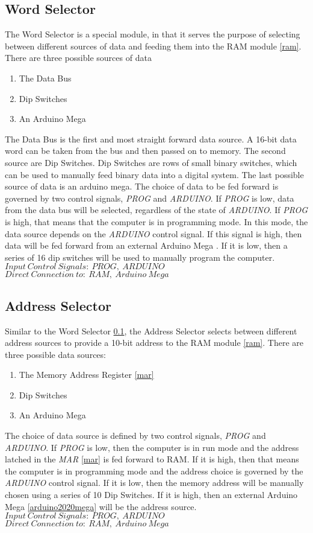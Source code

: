 \subsection{Word Selector} \label{word-select}
The Word Selector is a special module, in that it serves the purpose of selecting between different sources of data and feeding
them into the RAM module \ref{ram}. There are three possible sources of data
\begin{enumerate}
  \item The Data Bus
  \item Dip Switches
  \item An Arduino Mega
\end{enumerate}
The Data Bus is the first and most straight forward data source. A 16-bit data word can be taken from the bus and then passed on
to memory. The second source are Dip Switches. Dip Switches are rows of small binary switches, which can be used to manually feed
binary data into a digital system. The last possible source of data is an arduino mega. The choice of data to be fed forward is
governed by two control signals, \emph{PROG} and \emph{ARDUINO}. If \emph{PROG} is low, data from the data bus will be selected,
regardless of the state of \emph{ARDUINO}. If \emph{PROG} is high, that means that the computer is in programming mode. In this
mode, the data source depends on the \emph{ARDUINO} control signal. If this signal is high, then data will be fed forward from
an external Arduino Mega \cite{arduino2020mega}. If it is low, then a series of 16 dip switches will be used to manually program
the computer.  \\
\textbf{$Input\:Control\:Signals:\:PROG,\:ARDUINO$} \\
\textbf{$Direct\:Connection\:to:\:RAM,\:Arduino\:Mega$}

\subsection{Address Selector} \label{addr-select}
Similar to the Word Selector \ref{word-select}, the Address Selector selects between different address sources to provide a 10-bit
address to  the RAM module \ref{ram}. There are three possible data sources:
\begin{enumerate}
  \item The Memory Address Register \ref{mar}
  \item Dip Switches
  \item An Arduino Mega
\end{enumerate}
The choice of data source is defined by two control signals, \emph{PROG} and \emph{ARDUINO}. If \emph{PROG} is low, then the
computer is in run mode and the address latched in the \emph{MAR} \ref{mar} is fed forward to RAM. If it is high, then that means
the computer is in programming mode and the address choice is governed by the \emph{ARDUINO} control signal. If it is low, then
the memory address will be manually chosen using a series of 10 Dip Switches. If it is high, then an external
Arduino Mega \ref{arduino2020mega} will be the address source. \\
\textbf{$Input\:Control\:Signals:\:PROG,\:ARDUINO$}
\textbf{$Direct\:Connection\:to:\:RAM,\:Arduino\:Mega$}

